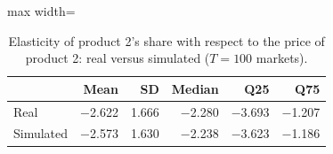 \begin{table}[H]
\centering\small
\caption{Elasticity of product 2's share with respect to the price of product 2: real versus simulated ($T=100$ markets).}\label{tab:q8d_cell_22}
\begin{adjustbox}{max width=\linewidth}
\begin{tabular}{lrrrrr}
\toprule
 & Mean & SD & Median & Q25 & Q75 \\
\midrule
Real & $-$2.622 & 1.666 & $-$2.280 & $-$3.693 & $-$1.207 \\
Simulated & $-$2.573 & 1.630 & $-$2.238 & $-$3.623 & $-$1.186 \\
\bottomrule
\end{tabular}
\end{adjustbox}
\par\vspace{3pt}{\footnotesize Element $(2,2)$ of the elasticity matrix $\partial s_j/\partial p_k\cdot p_k/s_j$ across the 100 markets; simulated uses the Q8c estimates, real uses the true parameters.}
\end{table}
